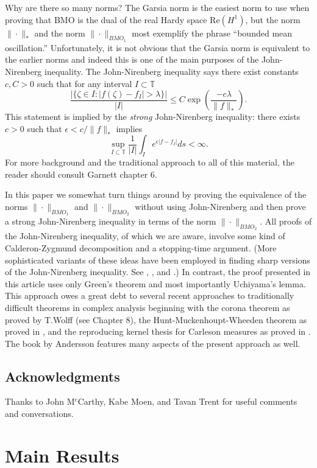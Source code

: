 \documentclass[12pt]{amsart}
\theoremstyle{definition}
\theoremstyle{remark}
\numberwithin{equation}{section}
\newcommand{\T}{\mathbb{T}}
\begin{document}
Why are there so many norms? The Garsia norm is the easiest norm to
use when proving that BMO is the dual of the real Hardy space
$\text{Re}(H^1)$, but the norm $\|\cdot\|_{*}$ and the norm
$\|\cdot\|_{BMO_1}$ most exemplify the phrase ``bounded mean
oscillation.'' Unfortunately, it is not obvious that the Garsia norm
is equivalent to the earlier norms and indeed this is one of the main
purposes of the John-Nirenberg inequality.  The John-Nirenberg
inequality says there exist constants $c, C>0$ such that for any
interval $I \subset \T$
\[
\frac{|\{\zeta \in I: |f(\zeta)-f_I| > \lambda\}|}{|I|} \leq
C\exp\left(\frac{-c\lambda}{\|f\|_{*}} \right).
\]
This statement is implied by the \emph{strong} John-Nirenberg
inequality: there exists $c>0$ such that $\epsilon < c/\|f\|_{*}$
implies
\[
\sup_{I \subset \T} \frac{1}{|I|} \int_{I} e^{\epsilon |f-f_I|} ds < \infty.
\]
For more background and the traditional approach to all of this
material, the reader should consult Garnett \cite{jG07} chapter 6.  

In this paper we somewhat turn things around by proving the
equivalence of the norms $\|\cdot\|_{BMO_1}$ and $\|\cdot\|_{BMO_2}$
without using John-Nirenberg and then prove a strong John-Nirenberg
inequality in terms of the norm $\|\cdot\|_{BMO_2}$.  All proofs of
the John-Nirenberg inequality, of which we are aware, involve some
kind of Calderon-Zygmund decomposition and a stopping-time
argument. (More sophisticated variants of these ideas have been
employed in finding sharp versions of the John-Nirenberg
inequality. See \cite{aK90}, \cite{SV07}, and \cite{SV11}.)  In
contrast, the proof presented in this article uses only Green's
theorem and most importantly Uchiyama's lemma.  This approach owes a
great debt to several recent approaches to traditionally difficult
theorems in complex analysis beginning with the corona theorem as
proved by T.Wolff (see \cite{jG07} Chapter 8), the
Hunt-Muckenhoupt-Wheeden theorem as proved in \cite{NT96}, and the
reproducing kernel thesis for Carleson measures as proved in
\cite{PTW07}.  The book by Andersson \cite{mA97} features many aspects
of the present approach as well.

\subsection*{Acknowledgments} 
Thanks to John M$^{\text{c}}$Carthy, Kabe Moen, and Tavan Trent for useful
comments and conversations.

\section{Main Results}
\end{document}
